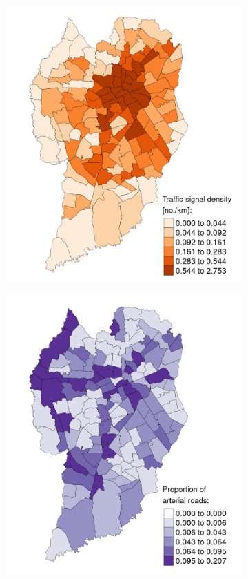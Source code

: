 \begin{figure}[!htbp]
    \centering\footnotesize
    \captionsetup{font=footnotesize}
    \caption{TSD AND PAR}
    \begin{subfigure}{0.5\textwidth}
        \includegraphics{fig/map_TSD.png}
    \end{subfigure}%
    \begin{subfigure}{0.5\textwidth}
        \includegraphics{fig/map_PAR.png}

\end{subfigure}
\end{figure}
